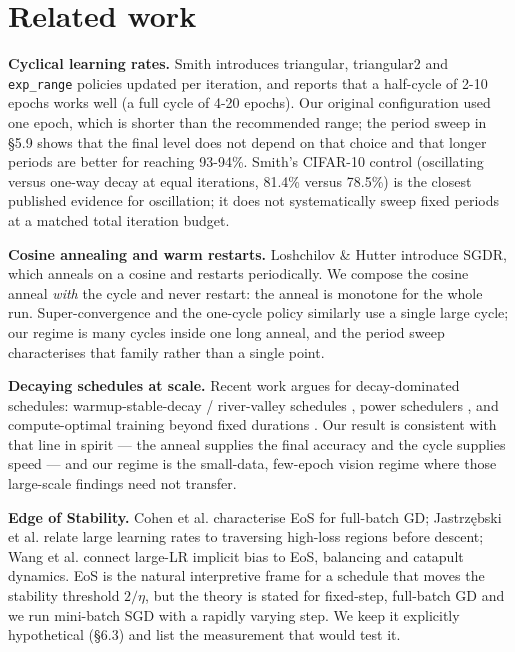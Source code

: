 \documentclass[11pt,a4paper]{article}
\begin{document}
\section{Related work}
\textbf{Cyclical learning rates.} Smith \cite{ref1} introduces triangular, triangular2 and \texttt{exp\_range} policies updated per iteration, and reports that a half-cycle of 2-10 epochs works well (a full cycle of 4-20 epochs). Our original configuration used one epoch, which is shorter than the recommended range; the period sweep in \S{}5.9 shows that the final level does not depend on that choice and that longer periods are better for reaching 93-94\%. Smith's CIFAR-10 control (oscillating versus one-way decay at equal iterations, 81.4\% versus 78.5\%) is the closest published evidence for oscillation; it does not systematically sweep fixed periods at a matched total iteration budget.

\textbf{Cosine annealing and warm restarts.} Loshchilov \& Hutter \cite{ref2} introduce SGDR, which anneals on a cosine and restarts periodically. We compose the cosine anneal \textit{with} the cycle and never restart: the anneal is monotone for the whole run. Super-convergence \cite{ref3} and the one-cycle policy \cite{ref4} similarly use a single large cycle; our regime is many cycles inside one long anneal, and the period sweep characterises that family rather than a single point.

\textbf{Decaying schedules at scale.} Recent work argues for decay-dominated schedules: warmup-stable-decay / river-valley schedules \cite{ref10}, power schedulers \cite{ref11}, and compute-optimal training beyond fixed durations \cite{ref9}. Our result is consistent with that line in spirit --- the anneal supplies the final accuracy and the cycle supplies speed --- and our regime is the small-data, few-epoch vision regime where those large-scale findings need not transfer.

\textbf{Edge of Stability.} Cohen et al. \cite{ref6} characterise EoS for full-batch GD; Jastrz\k{e}bski et al. \cite{ref7} relate large learning rates to traversing high-loss regions before descent; Wang et al. \cite{ref8} connect large-LR implicit bias to EoS, balancing and catapult dynamics. EoS is the natural interpretive frame for a schedule that moves the stability threshold $2/\eta$, but the theory is stated for fixed-step, full-batch GD and we run mini-batch SGD with a rapidly varying step. We keep it explicitly hypothetical (\S{}6.3) and list the measurement that would test it.
\end{document}
